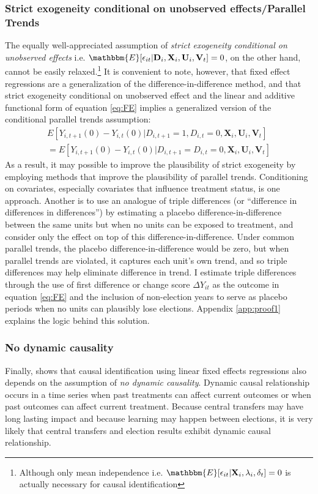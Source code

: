 \documentclass[12pt]{article}\usepackage[]{graphicx}\usepackage[]{color}
\newcommand{\1}{\mathbbm{1}}
\newcommand\E{\mathbbm{E}}
\begin{document}
\subsubsection{Strict exogeneity conditional on unobserved effects/Parallel Trends}
The equally well-appreciated assumption of \textit{strict exogeneity conditional on unobserved effects} i.e. $\E[\epsilon_{it} | \mathbf{D}_i, \mathbf{X}_i, \mathbf{U}_i, \mathbf{V}_t ] = 0$, on the other hand, cannot be easily relaxed.\footnote{Although only mean independence i.e. $\E[\epsilon_{it} | \mathbf{X}_i, \lambda_i, \delta_t] = 0$ is actually necessary for causal identification} It is convenient to note, however, that fixed effect regressions are a generalization of the difference-in-difference method, and that strict exogeneity conditional on unobserved effect and the linear and additive functional form of equation \ref{eq:FE} implies a generalized version of the conditional parallel trends assumption:
\begin{align*}
	E[Y_{i,t+1}(0) - Y_{i,t}(0) | D_{i,t+1} = 1, D_{i,t} = 0, \mathbf{X}_i, \mathbf{U}_i, \mathbf{V}_t] \\
	= E[Y_{i,t+1}(0) - Y_{i,t}(0) |  D_{i,t+1} = D_{i,t} = 0, \mathbf{X}_i, \mathbf{U}_i, \mathbf{V}_t]
\end{align*} 
As a result, it may possible to improve the plausibility of strict exogeneity by employing methods that improve the plausibility of parallel trends. Conditioning on covariates, especially covariates that influence treatment status, is one approach. Another is to use an analogue of triple differences (or ``difference in differences in differences'') by estimating a placebo difference-in-difference between the same units but when no units can be exposed to treatment, and consider only the effect on top of this difference-in-difference. Under common parallel trends, the placebo difference-in-difference would be zero, but when parallel trends are violated, it captures each unit's own trend, and so triple differences may help eliminate difference in trend. I estimate triple differences through the use of first difference or change score $\Delta Y_{it}$ as the outcome in equation \ref{eq:FE} and the inclusion of non-election years to serve as placebo periods when no units can plausibly lose elections. Appendix \ref{app:proof1} explains the logic behind this solution.

\subsubsection{No dynamic causality}
Finally, \citep{ImaiKim2012} shows that causal identification using linear fixed effects regressions also depends on the assumption of \textit{no dynamic causality}. Dynamic causal relationship occurs in a time series when past treatments can affect current outcomes or when past outcomes can affect current treatment. Because central transfers may have long lasting impact and because learning may happen between elections, it is very likely that central transfers and election results exhibit dynamic causal relationship.
\end{document}
